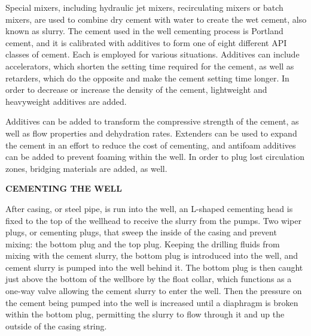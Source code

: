 \vspace{1em}

Special mixers, including hydraulic jet mixers, recirculating mixers or batch mixers,
are used to combine dry cement with water to create the wet cement, also known as slurry. 
The cement used in the well cementing process is Portland cement, and it is calibrated 
with additives to form one of eight different API classes of cement. Each is employed for various situations.
Additives can include accelerators, which shorten the setting time required for the cement,
as well as retarders, which do the opposite and make the cement setting time longer.
In order to decrease or increase the density of the cement, lightweight and heavyweight additives are added.

\vspace{2em}

Additives can be added to transform the compressive strength of the cement,
as well as flow properties and dehydration rates. Extenders can be used to 
expand the cement in an effort to reduce the cost of cementing, and antifoam additives
can be added to prevent foaming within the well. In order to plug lost circulation zones, 
bridging materials are added, as well.

\vspace{1em}

\noindent \textbf{CEMENTING THE WELL}

\vspace{1em}

After casing, or steel pipe, is run into the well, an L-shaped cementing 
head is fixed to the top of the wellhead to receive the slurry from the pumps. 
Two wiper plugs, or cementing plugs, that sweep the
inside of the casing and prevent mixing: the bottom plug and the top plug.
Keeping the drilling fluids from mixing with the cement slurry, 
the bottom plug is introduced into the well, and cement slurry is pumped into the well behind it. 
The bottom plug is then caught just above the bottom of the wellbore by the float collar, 
which functions as a one-way valve allowing the cement slurry to enter the well.
Then the pressure on the cement being pumped into the well is increased until a diaphragm is broken within the bottom plug,
permitting the slurry to flow through it and up the outside of the casing string.

\vspace{1em}



